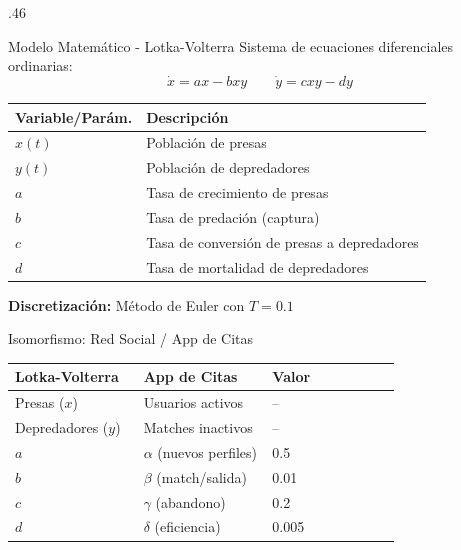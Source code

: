\documentclass[final]{beamer}
\begin{document}
\begin{frame}[fragile]{}
\begin{columns}
\begin{column}{.46\textwidth}
    \vspace{0.6cm}

    \begin{block}{Modelo Matemático - Lotka-Volterra}
    Sistema de ecuaciones diferenciales ordinarias:
    \[
    \dot{x} = ax - bxy \quad\quad \dot{y} = cxy - dy
    \]
    \begin{center}
    \begin{tabular}{ll}
    \toprule
    \textbf{Variable/Parám.} & \textbf{Descripción} \\
    \midrule
    $x(t)$ & Población de presas \\
    $y(t)$ & Población de depredadores \\
    $a$ & Tasa de crecimiento de presas \\
    $b$ & Tasa de predación (captura) \\
    $c$ & Tasa de conversión de presas a depredadores \\
    $d$ & Tasa de mortalidad de depredadores \\
    \bottomrule
    \end{tabular}
    \end{center}
    \textbf{Discretización:} Método de Euler con $T=0.1$
    \end{block}

    \vspace{0.6cm}

    \begin{block}{Isomorfismo: Red Social / App de Citas}
    \centering
    \normalsize
    \setlength{\tabcolsep}{3pt}
    \renewcommand{\arraystretch}{1.1}

    \begin{tabularx}{\linewidth}{@{}p{0.33\linewidth} p{0.33\linewidth} p{0.33\linewidth}@{}}
    \toprule
    \textbf{Lotka-Volterra} & \textbf{App de Citas} & \textbf{Valor} \\
    \midrule
    Presas ($x$) & Usuarios activos & -- \\
    Depredadores ($y$) & Matches inactivos & -- \\
    $a$ & $\alpha$ (nuevos perfiles) & 0.5 \\
    $b$ & $\beta$ (match/salida) & 0.01 \\
    $c$ & $\gamma$ (abandono) & 0.2 \\
    $d$ & $\delta$ (eficiencia) & 0.005 \\
    \bottomrule
    \end{tabularx}

    \end{block}


\end{column}
\end{columns}
\end{frame}
\end{document}
